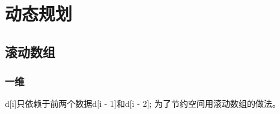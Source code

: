 
\chapter{动态规划}
\label{dp}



\section{滚动数组}

\subsection{一维}
d[i]只依赖于前两个数据d[i - 1]和d[i - 2]; 为了节约空间用滚动数组的做法。






\endinput %
